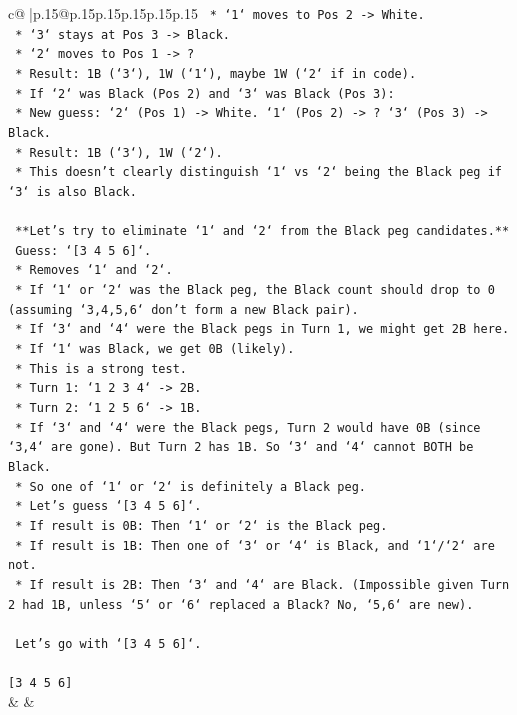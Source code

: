 \documentclass{article}
\begin{document}
{\begin{supertabular}{c@{$\;$}|p{.15\linewidth}@{}p{.15\linewidth}p{.15\linewidth}p{.15\linewidth}p{.15\linewidth}p{.15\linewidth}}
{{{\texttt{        *   `1` moves to Pos 2 {-}> White.} \\
\texttt{        *   `3` stays at Pos 3 {-}> Black.} \\
\texttt{        *   `2` moves to Pos 1 {-}> ?} \\
\texttt{        *   Result: 1B (`3`), 1W (`1`), maybe 1W (`2` if in code).} \\
\texttt{    *   If `2` was Black (Pos 2) and `3` was Black (Pos 3):} \\
\texttt{        *   New guess: `2` (Pos 1) {-}> White. `1` (Pos 2) {-}> ? `3` (Pos 3) {-}> Black.} \\
\texttt{        *   Result: 1B (`3`), 1W (`2`).} \\
\texttt{    *   This doesn't clearly distinguish `1` vs `2` being the Black peg if `3` is also Black.} \\
\\ 
\texttt{    **Let's try to eliminate `1` and `2` from the Black peg candidates.**} \\
\texttt{    Guess: `{[}3 4 5 6{]}`.} \\
\texttt{    *   Removes `1` and `2`.} \\
\texttt{    *   If `1` or `2` was the Black peg, the Black count should drop to 0 (assuming `3,4,5,6` don't form a new Black pair).} \\
\texttt{    *   If `3` and `4` were the Black pegs in Turn 1, we might get 2B here.} \\
\texttt{    *   If `1` was Black, we get 0B (likely).} \\
\texttt{    *   This is a strong test.} \\
\texttt{    *   Turn 1: `1 2 3 4` {-}> 2B.} \\
\texttt{    *   Turn 2: `1 2 5 6` {-}> 1B.} \\
\texttt{    *   If `3` and `4` were the Black pegs, Turn 2 would have 0B (since `3,4` are gone). But Turn 2 has 1B. So `3` and `4` cannot BOTH be Black.} \\
\texttt{    *   So one of `1` or `2` is definitely a Black peg.} \\
\texttt{    *   Let's guess `{[}3 4 5 6{]}`.} \\
\texttt{        *   If result is 0B: Then `1` or `2` is the Black peg.} \\
\texttt{        *   If result is 1B: Then one of `3` or `4` is Black, and `1`/`2` are not.} \\
\texttt{        *   If result is 2B: Then `3` and `4` are Black. (Impossible given Turn 2 had 1B, unless `5` or `6` replaced a Black? No, `5,6` are new).} \\
\\ 
\texttt{    Let's go with `{[}3 4 5 6{]}`.} \\
\\ 
\texttt{{[}3 4 5 6{]}} \\
            }
        }
    }
    & & \\ \\


\end{supertabular}}
\end{document}
